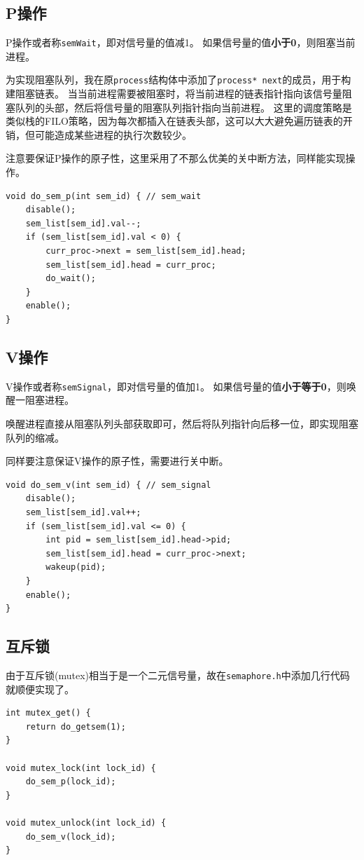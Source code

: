 \documentclass[logo,reportComp]{thesis}
\begin{document}
\subsection{P操作}
P操作或者称\verb'semWait'，即对信号量的值减1。
如果信号量的值\textbf{小于0}，则阻塞当前进程。

为实现阻塞队列，我在原\verb'process'结构体中添加了\verb'process* next'的成员，用于构建阻塞链表。
当当前进程需要被阻塞时，将当前进程的链表指针指向该信号量阻塞队列的头部，然后将信号量的阻塞队列指针指向当前进程。
这里的调度策略是类似栈的FILO策略，因为每次都插入在链表头部，这可以大大避免遍历链表的开销，但可能造成某些进程的执行次数较少。

注意要保证P操作的原子性，这里采用了不那么优美的关中断方法，同样能实现操作。
\begin{lstlisting}
void do_sem_p(int sem_id) { // sem_wait
    disable();
    sem_list[sem_id].val--;
    if (sem_list[sem_id].val < 0) {
        curr_proc->next = sem_list[sem_id].head;
        sem_list[sem_id].head = curr_proc;
        do_wait();
    }
    enable();
}
\end{lstlisting}

\subsection{V操作}
V操作或者称\verb'semSignal'，即对信号量的值加1。
如果信号量的值\textbf{小于等于0}，则唤醒一阻塞进程。

唤醒进程直接从阻塞队列头部获取即可，然后将队列指针向后移一位，即实现阻塞队列的缩减。

同样要注意保证V操作的原子性，需要进行关中断。
\begin{lstlisting}
void do_sem_v(int sem_id) { // sem_signal
    disable();
    sem_list[sem_id].val++;
    if (sem_list[sem_id].val <= 0) {
        int pid = sem_list[sem_id].head->pid;
        sem_list[sem_id].head = curr_proc->next;
        wakeup(pid);
    }
    enable();
}
\end{lstlisting}

\subsection{互斥锁}
由于互斥锁(mutex)相当于是一个二元信号量，故在\verb'semaphore.h'中添加几行代码就顺便实现了。
\begin{lstlisting}
int mutex_get() {
    return do_getsem(1);
}

void mutex_lock(int lock_id) {
    do_sem_p(lock_id);
}

void mutex_unlock(int lock_id) {
    do_sem_v(lock_id);
}
\end{lstlisting}
\end{document}
